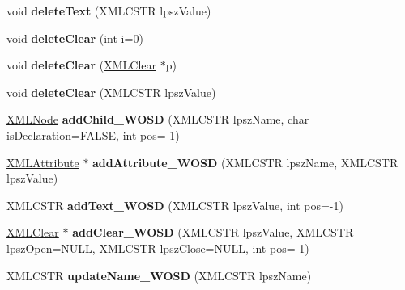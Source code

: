 \begin{DoxyCompactItemize}
\item 
\mbox{\label{struct_x_m_l_node_a21ee499630d71ab6026753a85f02f582}} 
void {\bfseries delete\+Text} (X\+M\+L\+C\+S\+TR lpsz\+Value)
\item 
\mbox{\label{struct_x_m_l_node_a44b72c82310eb4319dba46eb9cc9f6e9}} 
void {\bfseries delete\+Clear} (int i=0)
\item 
\mbox{\label{struct_x_m_l_node_ae92182823d3d5b40893103ad222ec4a8}} 
void {\bfseries delete\+Clear} (\hyperlink{struct_x_m_l_clear}{X\+M\+L\+Clear} $\ast$p)
\item 
\mbox{\label{struct_x_m_l_node_a8fff4baa9a8000f8662ee302438fff64}} 
void {\bfseries delete\+Clear} (X\+M\+L\+C\+S\+TR lpsz\+Value)
\item 
\mbox{\label{struct_x_m_l_node_acb8f9583792c008c80a6c788f3dedf39}} 
\hyperlink{struct_x_m_l_node}{X\+M\+L\+Node} {\bfseries add\+Child\+\_\+\+W\+O\+SD} (X\+M\+L\+C\+S\+TR lpsz\+Name, char is\+Declaration=F\+A\+L\+SE, int pos=-\/1)
\item 
\mbox{\label{struct_x_m_l_node_a776e46bdd596a7eff1d2dd4105c64034}} 
\hyperlink{struct_x_m_l_attribute}{X\+M\+L\+Attribute} $\ast$ {\bfseries add\+Attribute\+\_\+\+W\+O\+SD} (X\+M\+L\+C\+S\+TR lpsz\+Name, X\+M\+L\+C\+S\+TR lpsz\+Value)
\item 
\mbox{\label{struct_x_m_l_node_ab05f39710a61064adf3af30fd430acf2}} 
X\+M\+L\+C\+S\+TR {\bfseries add\+Text\+\_\+\+W\+O\+SD} (X\+M\+L\+C\+S\+TR lpsz\+Value, int pos=-\/1)
\item 
\mbox{\label{struct_x_m_l_node_a6ea1fad6ada2038f5cf2605839694d31}} 
\hyperlink{struct_x_m_l_clear}{X\+M\+L\+Clear} $\ast$ {\bfseries add\+Clear\+\_\+\+W\+O\+SD} (X\+M\+L\+C\+S\+TR lpsz\+Value, X\+M\+L\+C\+S\+TR lpsz\+Open=N\+U\+LL, X\+M\+L\+C\+S\+TR lpsz\+Close=N\+U\+LL, int pos=-\/1)
\item 
\mbox{\label{struct_x_m_l_node_af7cff0d6f43d4e6f163f2738a71ec4e5}} 
X\+M\+L\+C\+S\+TR {\bfseries update\+Name\+\_\+\+W\+O\+SD} (X\+M\+L\+C\+S\+TR lpsz\+Name)

\end{DoxyCompactItemize}
